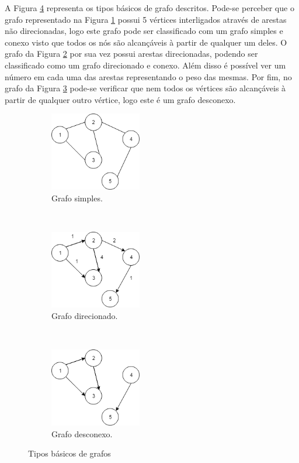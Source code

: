 A Figura \ref{fig_tipos_grafos} representa os tipos básicos de grafo descritos. Pode-se perceber que o grafo representado na Figura \ref{fig_grafo_simples} possui 5 vértices interligados através de arestas não direcionadas, logo este grafo pode ser classificado com um grafo simples e conexo visto que todos os nós são alcançáveis à partir de qualquer um deles. O grafo da Figura \ref{fig_grafo_direcionado} por sua vez possui arestas direcionadas, podendo ser classificado como um grafo direcionado e conexo. Além disso é possível ver um número em cada uma das arestas representando o peso das mesmas. Por fim, no grafo da Figura \ref{fig_grafo_desconexo} pode-se verificar que nem todos os vértices são alcançáveis à partir de qualquer outro vértice, logo este é um grafo desconexo.

\begin{figure}[t!]
	\centering
	\begin{subfigure}[t]{0.3\textwidth}
		\centering
		\includegraphics[width=4cm]{./figuras/grafo-simples.png} %
		\caption{Grafo simples.}
		\label{fig_grafo_simples}
	\end{subfigure}%
	~
	\begin{subfigure}[t]{0.3\textwidth}
		\centering
		\includegraphics[width=4cm]{./figuras/grafo-direcionado.png} %
	\caption{Grafo direcionado.}
	\label{fig_grafo_direcionado}
	\end{subfigure}
	~
	\begin{subfigure}[t]{0.3\textwidth}
		\centering
		\includegraphics[width=4cm]{./figuras/grafo-desconexo.png} %
	\caption{Grafo desconexo.}
	\label{fig_grafo_desconexo}
	\end{subfigure}
	\caption{Tipos básicos de grafos}
	\label{fig_tipos_grafos}
\end{figure}

